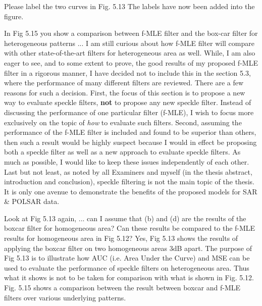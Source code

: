 \replyToComment
    {Please label the two curves in Fig. 5.13}
    {The labels have now been added into the figure.}    

\replyToComment
    {
      In Fig 5.15 you show a comparison between f-MLE filter and the box-car filter for heterogeneous patterns ...
      I am still curious about how f-MLE filter will compare with other state-of-the-art filters for heterogeneous area as well.
    }
    {
While, I am also eager to see, and to some extent to prove, the good results of my proposed f-MLE filter in a rigorous manner,
  I have decided not to include this in the section 5.3, where the performance of many different filters are reviewed.
There are a few reasons for such a decision.
First, the focus of this section is to propose a new way to evaluate speckle filters, \textbf{not} to propose any new speckle filter.
Instead of discussing the performance of one particular filter (f-MLE), I wish to focus more exclusively on the topic of \textit{how} to evaluate such filters.
Second, assuming the performance of the f-MLE filter is included and found to be superior than others,
  then such a result would be highly suspect
because I would in effect be proposing both a speckle filter as well as a new approach to evaluate speckle filters.
As much as possible, I would like to keep these issues independently of each other.
Last but not least, as noted by all Examiners and myself (in the thesis abstract, introduction and conclusion), speckle filtering is not the main topic of the thesis.
It is only one avenue to demonstrate the benefits of the proposed models for SAR \& POLSAR data.
    }

\replyToComment
    {
      Look at Fig 5.13 again, ... can I assume that (b) and (d) are the results of the boxcar filter for homogeneous area?
      Can these results be compared to the f-MLE results for homogeneous area in Fig 5.12?
    }
    {
      Yes, Fig 5.13 shows the results of applying the boxcar filter on two homogeneous areas 3dB apart.
      The purpose of Fig 5.13 is to illustrate how AUC (i.e. Area Under the Curve) and MSE can be used to evaluate the performance of speckle filters on heterogeneous area.
      Thus what it shows is not to be taken for comparison with what is shown in Fig. 5.12.
      Fig. 5.15 shows a comparison between the result between boxcar and f-MLE filters over various underlying patterns.
    }    



